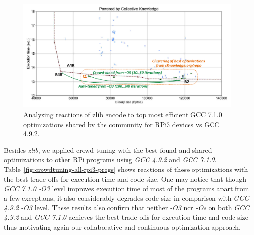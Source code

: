    \begin{figure}[!htbp]
     \centering
      \includegraphics[width=5.8in]
      {ck-assets/bae9e4979bd3bc4b-cropped.pdf} %
      \vspace{0.1in}
      \vspace{0.1in}
     \caption{
      Analyzing reactions of zlib encode to top most efficient GCC 7.1.0 optimizations shared by the community for RPi3 devices vs GCC 4.9.2.
     }
     \label{fig:autotuning-zlib-encode-gcc7-reactions}
   \end{figure}

Besides \textit{zlib}, we applied crowd-tuning with the best found and shared optimizations 
to other RPi programs using \textit{GCC 4.9.2} and \textit{GCC 7.1.0}.
%
Table~\ref{fig:crowdtuning-all-rpi3-progs} shows reactions of these optimizations
with the best trade-offs for execution time and code size.
%
One may notice that though \textit{GCC 7.1.0 -O3} level improves execution time
of most of the programs apart from a few exceptions, it also considerably degrades
code size in comparison with \textit{GCC 4.9.2 -O3} level.
%
These results also confirm that neither \textit{-O3} nor \textit{-Os} on both 
\textit{GCC 4.9.2} and \textit{GCC 7.1.0} achieves the best trade-offs for execution
time and code size thus motivating again our collaborative and continuous optimization
approach.

